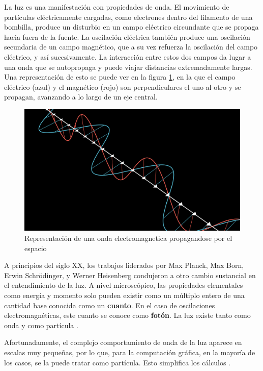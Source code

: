 La luz es una manifestación con propiedades de onda.
El movimiento de partículas eléctricamente cargadas, como electrones dentro del filamento de una bombilla, produce un disturbio en un campo eléctrico circundante que se propaga hacia fuera de la fuente.
La oscilación eléctrica también produce una oscilación secundaria de un campo magnético, que a su vez refuerza la oscilación del campo eléctrico, y así sucesivamente.
La interacción entre estos dos campos da lugar a una onda que se autopropaga y puede viajar distancias extremadamente largas.
Una representación de esto se puede ver en la figura \ref{fig:electromagnetic-wave}, en la que el campo eléctrico (azul) y el magnético (rojo) son perpendiculares el uno al otro y se propagan, avanzando a lo largo de un eje central.

\begin{figure}
    \centering
    \includegraphics[width=\textwidth]{electromagnetic_wave.png}
    \caption{Representación de una onda electromagnetica propagandose por el espacio}
    \label{fig:electromagnetic-wave}
\end{figure}

A principios del siglo XX, los trabajos liderados por Max Planck, Max Born, Erwin Schrödinger, y Werner Heisenberg condujeron a otro cambio sustancial en el entendimiento de la luz.
A nivel microscópico, las propiedades elementales como energía y momento solo pueden existir como un múltiplo entero de una cantidad base conocida como un \textbf{cuanto}.
En el caso de oscilaciones electromagnéticas, este cuanto se conoce como \textbf{fotón}.
La luz existe tanto como onda y como partícula \cite{quantum-light}.

Afortunadamente, el complejo comportamiento de onda de la luz aparece en escalas muy pequeñas, por lo que, para la computación gráfica, en la mayoría de los casos, se la puede tratar como partícula.
Esto simplifica los cálculos \cite{pbr}.

